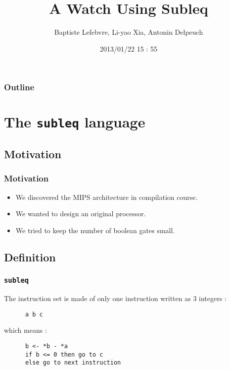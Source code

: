 \documentclass{beamer}
\begin{document}
\makeatletter

\title{A Watch Using Subleq}
\author{Baptiste Lefebvre, Li-yao Xia, Antonin Delpeuch}
\date{2013/01/22 15 : 55}

\begin{frame}
    \maketitle
\end{frame}

\begin{frame}
    \frametitle{Outline}
    \tableofcontents
\end{frame}
\section{The \texttt{subleq} language}
\subsection{Motivation}

\begin{frame}
    \frametitle{Motivation}
    \begin{itemize}
        \item We discovered the MIPS architecture in compilation course.
        \item We wanted to design an original processor.
        \item We tried to keep the number of boolean gates small.
    \end{itemize}
\end{frame}

\subsection{Definition}
\begin{frame}[fragile]
    \frametitle{\texttt{subleq}}

    The instruction set is made of only one instruction written as 3
    integers :
    \\[11pt]
    \begin{verbatim}
      a b c
    \end{verbatim}
    which means :

    \begin{verbatim}
      b <- *b - *a
      if b <= 0 then go to c
      else go to next instruction
    \end{verbatim}

\end{frame}
\end{document}
